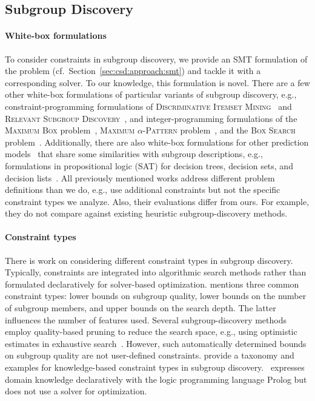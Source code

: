 \subsection{Subgroup Discovery}
\label{sec:related-work:constraints:subgroup-discovery}

\paragraph{White-box formulations}

To consider constraints in subgroup discovery, we provide an SMT formulation of the problem (cf.~Section~\ref{sec:csd:approach:smt}) and tackle it with a corresponding solver.
To our knowledge, this formulation is novel.
There are a few other white-box formulations of particular variants of subgroup discovery, e.g., constraint-programming formulations of \textsc{Discriminative Itemset Mining}~\cite{guns2011itemset, koccak2020exploiting} and \textsc{Relevant Subgroup Discovery}~\cite{koccak2020exploiting}, and integer-programming formulations of the \textsc{Maximum Box} problem~\cite{eckstein2002maximum}, \textsc{Maximum $\alpha$-Pattern} problem~\cite{bonates2008maximum}, and the \textsc{Box Search} problem~\cite{louveaux2014combinatorial}.
Additionally, there are also white-box formulations for other prediction models~\cite{ignatiev2021reasoning} that share some similarities with subgroup descriptions, e.g., formulations in propositional logic (SAT) for decision trees, decision sets, and decision lists~\cite{narodytska2018learning, shati2021sat, yu2021learning}.
All previously mentioned works address different problem definitions than we do, e.g., use additional constraints but not the specific constraint types we analyze.
Also, their evaluations differ from ours.
For example, they do not compare against existing heuristic subgroup-discovery methods.

\paragraph{Constraint types}

There is work on considering different constraint types in subgroup discovery.
Typically, constraints are integrated into algorithmic search methods rather than formulated declaratively for solver-based optimization.
\cite{meeng2021real} mentions three common constraint types:
lower bounds on subgroup quality, lower bounds on the number of subgroup members, and upper bounds on the search depth.
The latter influences the number of features used.
Several subgroup-discovery methods employ quality-based pruning to reduce the search space, e.g., using optimistic estimates in exhaustive search~\cite{atzmueller2015subgroup, atzmueller2009fast, grosskreutz2009subgroup}.
However, such automatically determined bounds on subgroup quality are not user-defined constraints.
\cite{atzmueller2006methodological, atzmueller2005exploiting, atzmueller2007using} provide a taxonomy and examples for knowledge-based constraint types in subgroup discovery.
\cite{atzmueller2007using}~expresses domain knowledge declaratively with the logic programming language Prolog but does not use a solver for optimization.

